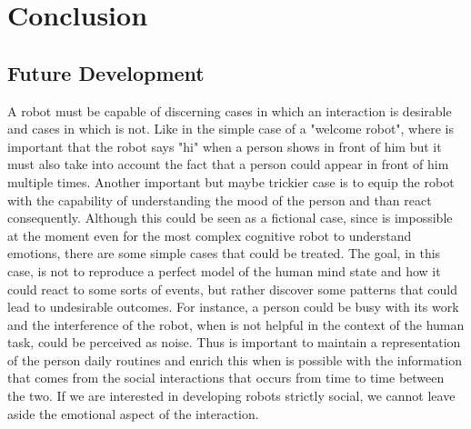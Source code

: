 \documentclass[pdftex,12pt,a4paper]{report}
\begin{document}
\chapter{Conclusion}

\section{Future Development}
A robot must be capable of discerning cases in which an interaction is desirable and cases in which is not. Like in the simple case of a "welcome robot", where is important that the robot says "hi" when a person shows in front of him but it must also take into account the fact that a person could appear in front of him multiple times. 
Another important but maybe trickier case is to equip the robot with the capability of understanding the mood of the person and than react consequently. Although this could be seen as a fictional case, since is impossible at the moment even for the most complex cognitive robot to understand emotions, there are some simple cases that could be treated. The goal, in this case, is not to reproduce a perfect model of the human mind state and how it could react to some sorts of events, but rather discover some patterns that could lead to undesirable outcomes. For instance, a person could be busy with its work and the interference of the robot, when is not helpful in the context of the human task, could be perceived as noise. Thus is important to maintain a representation of the person daily routines and enrich this when is possible with the information that comes from the social interactions that occurs from time to time between the two. If we are interested in developing robots strictly social, we cannot leave aside the emotional aspect of the interaction. 
\end{document}
